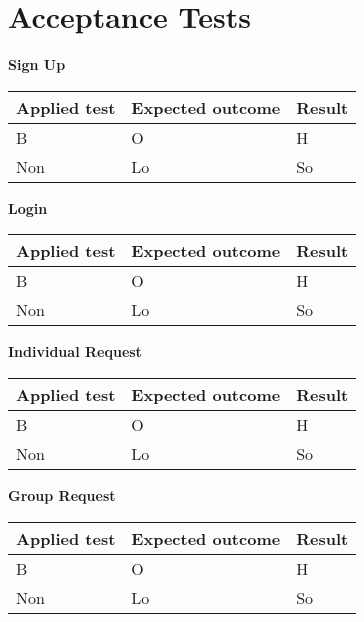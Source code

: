 \section{Acceptance Tests}
\textbf{Sign Up}
\begin{center}
	\begin{tabular}{|p{}|p{}|p{}|}
		\hline
		Applied test & Expected outcome & Result \\
		\hline
		B &
		O& 
		H \newline
		\\
		\hline
		Non &
		Lo& 
		So \newline
		\\
		\hline
	\end{tabular}
\end{center}

\textbf{Login}
\begin{center}
	\begin{tabular}{|p{}|p{}|p{}|}
		\hline
		Applied test & Expected outcome & Result \\
		\hline
		B &
		O& 
		H \newline
		\\
		\hline
		Non &
		Lo& 
		So \newline
		\\
		\hline
	\end{tabular}
\end{center}

\textbf{Individual Request}
\begin{center}
	\begin{tabular}{|p{}|p{}|p{}|}
		\hline
		Applied test & Expected outcome & Result \\
		\hline
		B &
		O& 
		H \newline
		\\
		\hline
		Non &
		Lo& 
		So \newline
		\\
		\hline
	\end{tabular}
\end{center}

\textbf{Group Request}
\begin{center}
	\begin{tabular}{|p{}|p{}|p{}|}
		\hline
		Applied test & Expected outcome & Result \\
		\hline
		B &
		O& 
		H \newline
		\\
		\hline
		Non &
		Lo& 
		So \newline
		\\
		\hline
	\end{tabular}
\end{center}